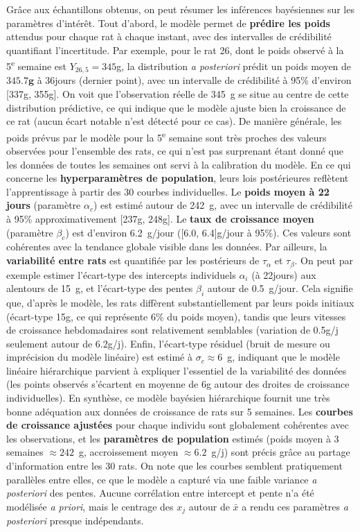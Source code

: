 \documentclass[12pt]{article}
\begin{document}
Grâce aux échantillons obtenus, on peut résumer les inférences bayésiennes sur les paramètres d’intérêt. Tout d’abord, le modèle permet de \textbf{prédire les poids} attendus pour chaque rat à chaque instant, avec des intervalles de crédibilité quantifiant l’incertitude. Par exemple, pour le rat 26, dont le poids observé à la 5\textsuperscript{e} semaine est $Y_{26,5}=345$g, la distribution \textit{a posteriori} prédit un poids moyen de $\mathbf{345.7 g}$ à 36jours (dernier point), avec un intervalle de crédibilité à 95\% d’environ [337g, 355g]. On voit que l’observation réelle de 345~g se situe au centre de cette distribution prédictive, ce qui indique que le modèle ajuste bien la croissance de ce rat (aucun écart notable n’est détecté pour ce cas). De manière générale, les poids prévus par le modèle pour la 5\textsuperscript{e} semaine sont très proches des valeurs observées pour l’ensemble des rats, ce qui n’est pas surprenant étant donné que les données de toutes les semaines ont servi à la calibration du modèle. En ce qui concerne les \textbf{hyperparamètres de population}, leurs lois postérieures reflètent l’apprentissage à partir des 30 courbes individuelles. Le \textbf{poids moyen à 22 jours} (paramètre $\alpha_c$) est estimé autour de 242~g, avec un intervalle de crédibilité à 95\% approximativement [237g, 248g]. Le \textbf{taux de croissance moyen} (paramètre $\beta_c$) est d’environ 6.2~g/jour ([6.0, 6.4]g/jour à 95\%). Ces valeurs sont cohérentes avec la tendance globale visible dans les données. Par ailleurs, la \textbf{variabilité entre rats} est quantifiée par les postérieurs de $\tau_\alpha$ et $\tau_\beta$. On peut par exemple estimer l’écart-type des intercepts individuels $\alpha_i$ (à 22jours) aux alentours de 15~g, et l’écart-type des pentes $\beta_i$ autour de 0.5~g/jour. Cela signifie que, d’après le modèle, les rats diffèrent substantiellement par leurs poids initiaux (écart-type 15g, ce qui représente 6\% du poids moyen), tandis que leurs vitesses de croissance hebdomadaires sont relativement semblables (variation de 0.5g/j seulement autour de 6.2g/j). Enfin, l’écart-type résiduel (bruit de mesure ou imprécision du modèle linéaire) est estimé à $\sigma_c \approx 6$~g, indiquant que le modèle linéaire hiérarchique parvient à expliquer l’essentiel de la variabilité des données (les points observés s’écartent en moyenne de 6g autour des droites de croissance individuelles). En synthèse, ce modèle bayésien hiérarchique fournit une très bonne adéquation aux données de croissance de rats sur 5 semaines. Les \textbf{courbes de croissance ajustées} pour chaque individu sont globalement cohérentes avec les observations, et les \textbf{paramètres de population} estimés (poids moyen à 3 semaines $\approx 242$~g, accroissement moyen $\approx 6.2$~g/j) sont précis grâce au partage d’information entre les 30 rats. On note que les courbes semblent pratiquement parallèles entre elles, ce que le modèle a capturé via une faible variance \textit{a posteriori} des pentes. Aucune corrélation entre intercept et pente n’a été modélisée \textit{a priori}, mais le centrage des $x_j$ autour de $\bar{x}$ a rendu ces paramètres \textit{a posteriori} presque indépendants. 
\end{document}
